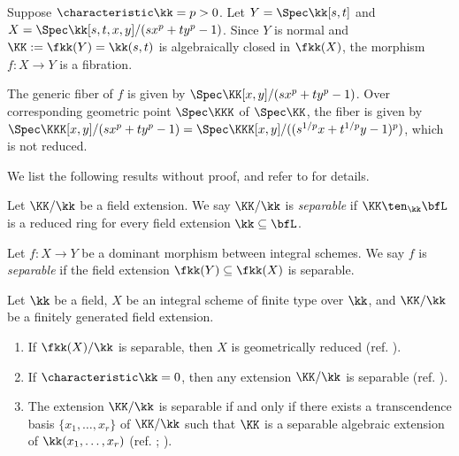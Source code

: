   \begin{example}\label{eg:fibration_with_non_reduced_fiber}
    Suppose $\characteristic \kk = p > 0$.
    Let $Y = \Spec \kk[s,t]$ and $X = \Spec \kk[s,t,x,y]/(sx^p + ty^p - 1)$.
    Since $Y$ is normal and $\KK := \fkk(Y) = \kk(s,t)$ is algebraically closed in $\fkk(X)$, the morphism $f: X \to Y$ is a fibration.

    The generic fiber of $f$ is given by $\Spec \KK[x,y]/(sx^p + ty^p - 1)$.
    Over corresponding geometric point $\Spec \KKK$ of $\Spec \KK$, the fiber is given by $\Spec \KKK[x,y]/(sx^p + ty^p - 1) = \Spec \KKK[x,y]/((s^{1/p}x + t^{1/p}y - 1)^p)$, which is not reduced.
     \Yang{}
  \end{example}

  We list the following results without proof, and refer to \cite[\href{https://stacks.math.columbia.edu/tag/030I}{Tag 030I}, \href{https://stacks.math.columbia.edu/tag/05DS}{Tag 05DS}, \href{https://stacks.math.columbia.edu/tag/05DT}{Tag 05DT}, \href{https://stacks.math.columbia.edu/tag/05DU}{Tag 05DU} and \href{https://stacks.math.columbia.edu/tag/035U}{Tag 035U}]{Stacks} for details.
  
  \begin{definition}\label{def:separable_field_extensions_and_morphisms}
    Let $\KK/\kk$ be a field extension.
    We say $\KK/\kk$ is \emph{separable} if $\KK \ten_\kk \bfL$ is a reduced ring for every field extension $\kk \subseteq \bfL$.

    Let $f: X \to Y$ be a dominant morphism between integral schemes.
    We say $f$ is \emph{separable} if the field extension $\fkk(Y) \subseteq \fkk(X)$ is separable.
  \end{definition}

  \begin{lemma}\label{lem:criterion_of_geometrical_reducedness_by_separability}
    Let $\kk$ be a field, $X$ be an integral scheme of finite type over $\kk$, and $\KK/\kk$ be a finitely generated field extension.
    \begin{enumerate}
      \item If $\fkk(X)/\kk$ is separable, then $X$ is geometrically reduced (ref. \cite[\href{https://stacks.math.columbia.edu/tag/030U}{Tag 030U}]{Stacks}).
      \item If $\characteristic \kk = 0$, then any extension $\KK/\kk$ is separable (ref. \cite[\href{https://stacks.math.columbia.edu/tag/030Z}{Tag 030Z}]{Stacks}).
      \item The extension $\KK/\kk$ is separable if and only if there exists a transcendence basis $\{x_1, \dots, x_r\}$ of $\KK/\kk$ such that $\KK$ is a separable algebraic extension of $\kk(x_1, \dots, x_r)$ (ref. \cite[\href{https://stacks.math.columbia.edu/tag/030X}{Tag 030X}]{Stacks}; \cite[Theorem 26.2]{Mat89}).
    \end{enumerate}
  \end{lemma}



